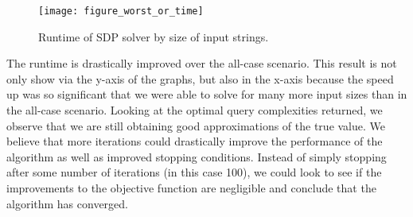 \begin{figure}[ht]
\centering
\texttt{[image: figure\_worst\_or\_time]}
\caption{Runtime of SDP solver by size of input strings.}
\label{fig:or_worst_runtime}
\end{figure}

The runtime is drastically improved over the all-case scenario. 
This result is not only show via the y-axis of the graphs, 
but also in the x-axis because the speed up was so 
significant that we were able to solve for many more 
input sizes than in the all-case scenario. 
Looking at the optimal query complexities returned, 
we observe that we are still obtaining good 
approximations of the true value. 
We believe that more iterations could drastically 
improve the performance of the algorithm as well as 
improved stopping conditions. Instead of simply stopping 
after some number of iterations (in this case 100), 
we could look to see if the improvements to the objective 
function are negligible and conclude that the algorithm has converged.
